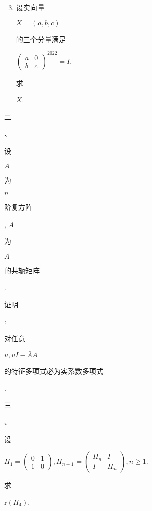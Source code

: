 \documentclass[10pt]{article}
\begin{document}
\begin{enumerate}
  \setcounter{enumi}{2}
  \item \begin{CJK}{UTF8}{mj}设实向量\end{CJK} $X=(a, b, c)$ \begin{CJK}{UTF8}{mj}的三个分量满足\end{CJK} $\left(\begin{array}{ll}a & 0 \\ b & c\end{array}\right)^{2022}=I$, \begin{CJK}{UTF8}{mj}求\end{CJK} $X$.
\end{enumerate}
\begin{CJK}{UTF8}{mj}二\end{CJK}、\begin{CJK}{UTF8}{mj}设\end{CJK} $A$ \begin{CJK}{UTF8}{mj}为\end{CJK} $n$ \begin{CJK}{UTF8}{mj}阶复方阵\end{CJK}, $\bar{A}$ \begin{CJK}{UTF8}{mj}为\end{CJK} $A$ \begin{CJK}{UTF8}{mj}的共轭矩阵\end{CJK}. \begin{CJK}{UTF8}{mj}证明\end{CJK}: \begin{CJK}{UTF8}{mj}对任意\end{CJK} $u, u I-\bar{A} A$ \begin{CJK}{UTF8}{mj}的特征多项式必为实系数多项式\end{CJK}.

\begin{CJK}{UTF8}{mj}三\end{CJK}、\begin{CJK}{UTF8}{mj}设\end{CJK} $H_{1}=\left(\begin{array}{ll}0 & 1 \\ 1 & 0\end{array}\right), H_{n+1}=\left(\begin{array}{cc}H_{n} & I \\ I & H_{n}\end{array}\right), n \geq 1$. \begin{CJK}{UTF8}{mj}求\end{CJK} $\mathrm{r}\left(H_{4}\right)$.
\end{document}
